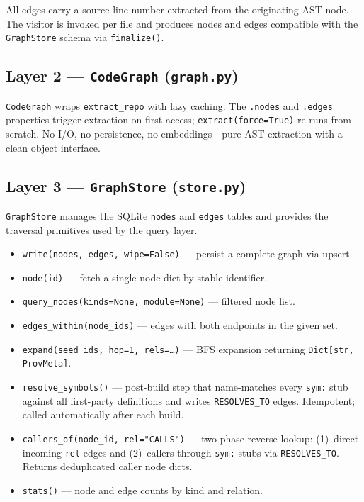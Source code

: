\documentclass[10pt]{article}
\begin{document}
All edges carry a source line number extracted from the originating AST node.
The visitor is invoked per file and produces nodes and edges compatible with the
\texttt{GraphStore} schema via \texttt{finalize()}.

\subsection{Layer 2 --- \texttt{CodeGraph} (\texttt{graph.py})}

\texttt{CodeGraph} wraps \texttt{extract\_repo} with lazy caching. The
\texttt{.nodes} and \texttt{.edges} properties trigger extraction on first access;
\texttt{extract(force=True)} re-runs from scratch. No I/O, no persistence, no
embeddings---pure AST extraction with a clean object interface.

\subsection{Layer 3 --- \texttt{GraphStore} (\texttt{store.py})}
\label{sec:graphstore}

\texttt{GraphStore} manages the SQLite \texttt{nodes} and \texttt{edges} tables and
provides the traversal primitives used by the query layer.

\begin{itemize}
\item \texttt{write(nodes, edges, wipe=False)} --- persist a complete graph via
upsert.
\item \texttt{node(id)} --- fetch a single node dict by stable identifier.
\item \texttt{query\_nodes(kinds=None, module=None)} --- filtered node list.
\item \texttt{edges\_within(node\_ids)} --- edges with both endpoints in the given
set.
\item \texttt{expand(seed\_ids, hop=1, rels=\ldots)} --- BFS expansion returning
\texttt{Dict[str, ProvMeta]}.
\item \texttt{resolve\_symbols()} --- post-build step that name-matches every
\texttt{sym:} stub against all first-party definitions and writes
\texttt{RESOLVES\_TO} edges. Idempotent; called automatically after each build.
\item \texttt{callers\_of(node\_id, rel="CALLS")} --- two-phase reverse lookup:
(1)~direct incoming \texttt{rel} edges and (2)~callers through \texttt{sym:} stubs
via \texttt{RESOLVES\_TO}. Returns deduplicated caller node dicts.
\item \texttt{stats()} --- node and edge counts by kind and relation.
\end{itemize}
\end{document}
